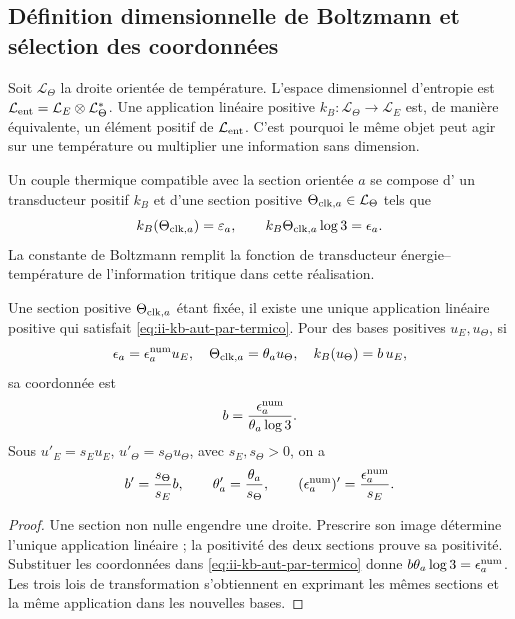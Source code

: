 \subsection{Définition dimensionnelle de Boltzmann et sélection des coordonnées}

Soit \(\mathcal L_\Theta\) la droite orientée de température. L'espace dimensionnel d'entropie est \(\mathcal L_{\rm ent}=\mathcal L_E\otimes\mathcal L_\Theta^*\). Une application linéaire positive \(k_B:\mathcal L_\Theta\to\mathcal L_E\) est, de manière équivalente, un élément positif de \(\mathcal L_{\rm ent}\). C'est pourquoi le même objet peut agir sur une température ou multiplier une information sans dimension.

\begin{definition}
Un couple thermique compatible avec la section orientée \(a\) se compose d'
un transducteur positif \(k_B\) et d'une section positive
\(\Theta_{{\rm clk},a}\in\mathcal L_\Theta\) tels que
\begin{equation}
 k_B(\Theta_{{\rm clk},a})=\varepsilon_a,
 \qquad
 k_B\Theta_{{\rm clk},a}\log3=\epsilon_a.
 \label{eq:ii-kb-aut-par-termico}
\end{equation}
La constante de Boltzmann remplit la fonction de transducteur
énergie--température de l'information tritique dans cette réalisation.
\end{definition}

\begin{theorem}
Une section positive \(\Theta_{{\rm clk},a}\) étant fixée, il existe une unique application linéaire positive qui satisfait \eqref{eq:ii-kb-aut-par-termico}. Pour des bases positives \(u_E,u_\Theta\), si
\[
 \epsilon_a=\epsilon_a^{\rm num}u_E,\quad
 \Theta_{{\rm clk},a}=\theta_a u_\Theta,\quad
 k_B(u_\Theta)=b\,u_E,
\]
sa coordonnée est
\begin{equation}
 b=\frac{\epsilon_a^{\rm num}}{\theta_a\log3}.
 \label{eq:ii-kb-aut-coordenada}
\end{equation}
Sous \(u'_E=s_Eu_E\), \(u'_\Theta=s_\Theta u_\Theta\), avec
\(s_E,s_\Theta>0\), on a
\[
 b'=\frac{s_\Theta}{s_E}b,\qquad
 \theta'_a=\frac{\theta_a}{s_\Theta},\qquad
 (\epsilon_a^{\rm num})'=\frac{\epsilon_a^{\rm num}}{s_E}.
\]
\end{theorem}
\begin{proof}
Une section non nulle engendre une droite. Prescrire son image détermine
l'unique application linéaire ; la positivité des deux sections prouve
sa positivité. Substituer les coordonnées dans
\eqref{eq:ii-kb-aut-par-termico} donne
\(b\theta_a\log3=\epsilon_a^{\rm num}\). Les trois lois de
transformation s'obtiennent en exprimant les mêmes sections et la même
application dans les nouvelles bases.
\end{proof}

